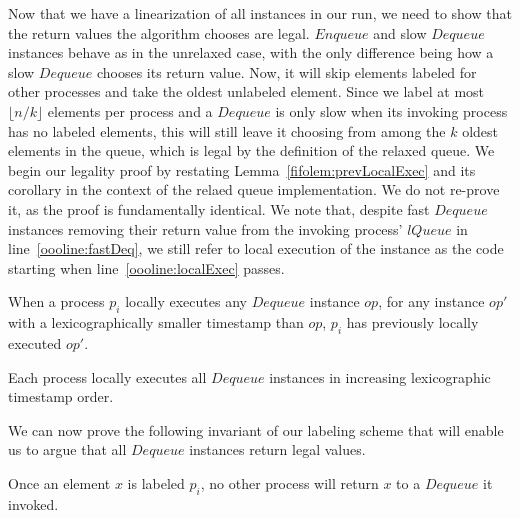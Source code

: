 \documentclass[a4paper,anonymous,USenglish]{lipics-v2021}
\theoremstyle{definition}
\begin{document}

Now that we have a linearization of all instances in our run, we need to show that the return values the algorithm chooses are legal.  $Enqueue$ and slow $Dequeue$ instances behave as in the unrelaxed case, with the only difference being how a slow $Dequeue$ chooses its return value.  Now, it will skip elements labeled for other processes and take the oldest unlabeled element.  Since we label at most $\lfloor n/k\rfloor$ elements per process and a $Dequeue$ is only slow when its invoking process has no labeled elements, this will still leave it choosing from among the $k$ oldest elements in the queue, which is legal by the definition of the relaxed queue.  We begin our legality proof by restating Lemma~\ref{fifolem:prevLocalExec} and its corollary in the context of the relaed queue implementation.  We do not re-prove it, as the proof is fundamentally identical.  We note that, despite fast $Dequeue$ instances removing their return value from the invoking process' $lQueue$ in line~\ref{oooline:fastDeq}, we still refer to local execution of the instance as the code starting when line~\ref{oooline:localExec} passes.

\begin{lemma}
  When a process $p_i$ locally executes any $Dequeue$ instance $op$, for any instance $op'$ with a lexicographically smaller timestamp than $op$, $p_i$ has previously locally executed $op'$.
\end{lemma}

\begin{corollary}\label{ooolem:localExecOrder}
  Each process locally executes all $Dequeue$ instances in increasing lexicographic timestamp order.
\end{corollary}

We can now prove the following invariant of our labeling scheme that will enable us to argue that all $Dequeue$ instances return legal values.

\begin{lemma}\label{ooolem:labelOwner}
  Once an element $x$ is labeled $p_i$, no other process will return $x$ to a $Dequeue$ it invoked.
\end{lemma}
\end{document}
